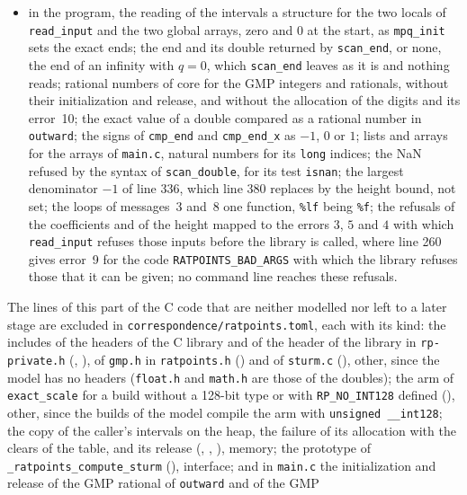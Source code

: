 \begin{itemize}
  \item in the program, the reading of the intervals a structure for the two locals of
    \verb|read_input| and the two global arrays, zero and $0$ at the start, as \verb|mpq_init| sets
    the exact ends; the end and its double returned by \verb|scan_end|, or none, the end of an
    infinity with $q = 0$, which \verb|scan_end| leaves as it is and nothing reads; rational numbers
    of core for the GMP integers and rationals, without their initialization and release, and
    without the allocation of the digits and its error~10; the exact value of a double compared as a
    rational number in \verb|outward|; the signs of \verb|cmp_end| and \verb|cmp_end_x| as $-1$, $0$
    or $1$; lists and arrays for the arrays of \verb|main.c|, natural numbers for its \verb|long|
    indices; the NaN refused by the syntax of \verb|scan_double|, for its test \verb|isnan|; the
    largest denominator $-1$ of line 336, which line 380 replaces by the height bound, not set; the
    loops of messages~3 and~8 one function, \verb|%lf| being \verb|%f|; the refusals of the
    coefficients and of the height mapped to the errors $3$, $5$ and $4$ with which
    \verb|read_input| refuses those inputs before the library is called, where line 260 gives
    error~9 for the code \verb|RATPOINTS_BAD_ARGS| with which the library refuses those that it can
    be given; no command line reaches these refusals.
\end{itemize}
The lines of this part of the C code that are neither modelled nor left to a later stage are
excluded in \verb|correspondence/ratpoints.toml|, each with its kind: the includes of the headers of
the C library and of the header of the library in \verb|rp-private.h|
(, ), of \verb|gmp.h| in
\verb|ratpoints.h| () and of \verb|sturm.c|
(), other, since the model has no headers (\verb|float.h| and \verb|math.h|
are those of the doubles); the arm of \verb|exact_scale| for a build without a 128-bit type or with
\verb|RP_NO_INT128| defined (), other, since the builds of the
model compile the arm with \verb|unsigned __int128|; the copy of the caller's intervals on the heap,
the failure of its allocation with the clears of the table, and its release
(, , ), memory; the
prototype of \verb|_ratpoints_compute_sturm| (), interface; and in
\verb|main.c| the initialization and release of the GMP rational of \verb|outward| and of the GMP
